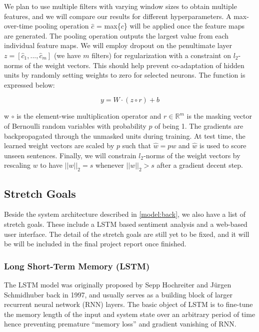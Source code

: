 \documentclass[conference]{IEEEtran}
\begin{document}
    We plan to use multiple filters with varying window sizes to obtain multiple features, and we will
    compare our results for different hyperparameters.
    A max-over-time pooling operation $\hat{c}$ = max\{$c$\} will be applied once the feature
    maps are generated. The pooling operation outputs the largest value from each individual
    feature maps. We will employ dropout on the penultimate layer $z = [\hat{c}_1,...,\hat{c}_m]$
    (we have $m$ filters) for regularization with a constraint on $l_2$-norms of the weight
    vectors. This should help prevent co-adaptation of hidden units by randomly setting weights
    to zero for selected neurons. The function is expressed below:

    \begin{equation}
    y = W \cdot (z \circ r) + b
    \end{equation}

    w $\circ$ is the element-wise multiplication operator and $r \in \mathbb{R}^m$ is
    the masking vector of Bernoulli random variables with probability $p$ of being 1.
    The gradients are backpropagated through the unmasked units during training. At test
    time, the learned weight vectors are scaled by $p$ such that $\hat{w} = pw$ and $\hat{w}$
    is used to score unseen sentences. Finally, we will constrain $l_2$-norms of the weight
    vectors by rescaling $w$ to have $||w||_2 = s$ whenever $||w||_2 > s$ after a gradient
    decent step.

\subsection{Stretch Goals}
\label{model:stretch}
    
    Beside the system architecture described in \autoref{model:back}, we also have a
    list of stretch goals. These include a LSTM based sentiment analysis and a 
    web-based user interface. The detail of the stretch
    goals are still yet to be fixed, and it will be will be included in the final project
    report once finished. 

\subsubsection{Long Short-Term Memory (LSTM)}
\label{model:stretch:lstm}
    The LSTM model was originally proposed by Sepp Hochreiter and J\"urgen Schmidhuber back in 
    1997\cite{hochreiter1997long}, and usually serves as a building block of larger
    recurrent neural network (RNN) layers. The basic object of LSTM is to fine-tune
    the memory length of the input and system state over an arbitrary period of time
    hence preventing premature ``memory loss'' and gradient vanishing of RNN.
    
\end{document}
